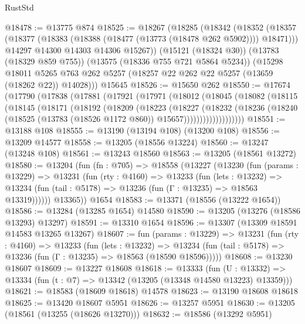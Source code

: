 \begin{lexlean}{RustStd}
\begin{coremodule}
@18478 := @13775 @874
@18525 := @18267
    (@18285
      (@18342
        (@18352
          (@18357 (@18377 (@18383 (@18388 (@18477 (@13773 (@18478 @262 @5902)))) @18471)))
          @14297
          @14300
          @14303
          @14306
          @15267))
      (@15121 (@18324 @30))
      (@13783 (@18329 @859 @755))
      (@13575 (@18336 @755 @721 @5864 @5234))
      (@15298
        @18011
        @5265
        @763
        @262
        @5257
        (@18257 @22 @262 @22 @5257 (@13659 (@18262 @22)) @14028)))
    @15645
@18526 := @15650 @262
@18550 := @17674
    (@17790
      (@17838
        (@17881
          (@17921
            (@17971
              (@18012
                (@18045
                  (@18082
                    (@18115
                      (@18145
                        (@18171
                          (@18192
                            (@18209
                              (@18223
                                (@18227
                                  (@18232
                                    (@18236
                                      (@18240
                                        (@18525
                                          (@13783 (@18526 @1172 @860))
                                          @15657)))))))))))))))))))
@18551 := @13188 @108
@18555 := @13190 (@13194 @108) (@13200 @108)
@18556 := @13209 @14577
@18558 := @13205 (@18556 @13224)
@18560 := @13247 (@13248 @108)
@18561 := @13243 @18560
@18563 := @13205 (@18561 @13272)
@18580 := @13204
    (fun (fn : @705) =>
    @18558
      (@13227
        (@13230
          (fun (params : @13229) =>
          @13231
            (fun (rty : @4160) =>
            @13233
              (fun (lets : @13232) =>
              @13234 (fun (tail : @5178) => @13236 (fun (Γ : @13235) => @18563 @13319))))))
        @13365))
    @1654
@18583 := @13371 (@18556 (@13222 @1654))
@18586 := @13284 (@13285 @1654) @14580
@18590 := @13205 (@13276 (@18586 @13293) @13297)
@18591 := @13310 @1654
@18596 := @13307 (@13309 @18591 @14583 @13265 @13267)
@18607 := fun (params : @13229) =>
  @13231
    (fun (rty : @4160) =>
    @13233
      (fun (lets : @13232) =>
      @13234 (fun (tail : @5178) => @13236 (fun (Γ : @13235) => @18563 (@18590 @18596)))))
@18608 := @13230 @18607
@18609 := @13227 @18608
@18618 := @13333
    (fun (U : @13332) => @13334 (fun (t : @7) => @13342 (@13205 (@13348 @14580 @13223) @13359)))
@18621 := @18583 (@18609 @18618) @14578
@18623 := @13190 @18608 @18618
@18625 := @13420 @18607 @5951
@18626 := @13257 @5951
@18630 := @13205 (@18561 (@13255 (@18626 @13270)))
@18632 := @18586 (@13292 @5951)

\end{coremodule}
\end{lexlean}

